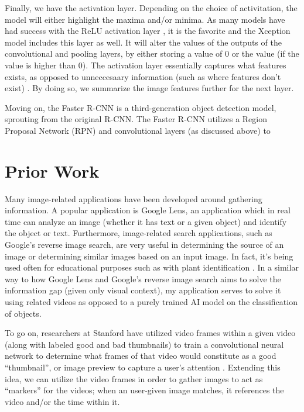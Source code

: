 \documentclass[10pt,twocolumn]{article}
\begin{document}
Finally, we have the activation layer. Depending on the choice of activitation, the model will either highlight the maxima and/or minima. As many models have had success with the ReLU activation layer \cite{}, it is the favorite and the Xception model includes this layer as well. It will alter the values of the outputs of the convolutional and pooling layers, by either storing a value of 0 or the value (if the value is higher than 0). The activation layer essentially captures what features exists, as opposed to unneccesaary information (such as where features don't exist) \cite{}. By doing so, we summarize the image features further for the next layer.

Moving on, the Faster R-CNN is a third-generation object detection model, sprouting from the original R-CNN. The Faster R-CNN utilizes a Region Proposal Network (RPN) and convolutional layers (as discussed above) to 

\section{Prior Work}

Many image-related applications have been developed around gathering information. A popular application is Google Lens, an application which in real time can analyze an image (whether it has text or a given object) and identify the object or text. Furthermore, image-related search applications, such as Google’s reverse image search, are very useful in determining the source of an image or determining similar images based on an input image. In fact, it’s being used often for educational purposes such as with plant identification \cite{Moore2018}. In a similar way to how Google Lens and Google’s reverse image search aims to solve the information gap (given only visual context), my application serves to solve it using related videos as opposed to a purely trained AI model on the classification of objects.

To go on, researchers at Stanford have utilized video frames within a given video (along with labeled good and bad thumbnails) to train a convolutional neural network to determine what frames of that video would constitute as a good “thumbnail”, or image preview to capture a user’s attention \cite{Stanford2017}. Extending this idea, we can utilize the video frames in order to gather images to act as “markers” for the videos; when an user-given image matches, it references the video and/or the time within it.
\end{document}
